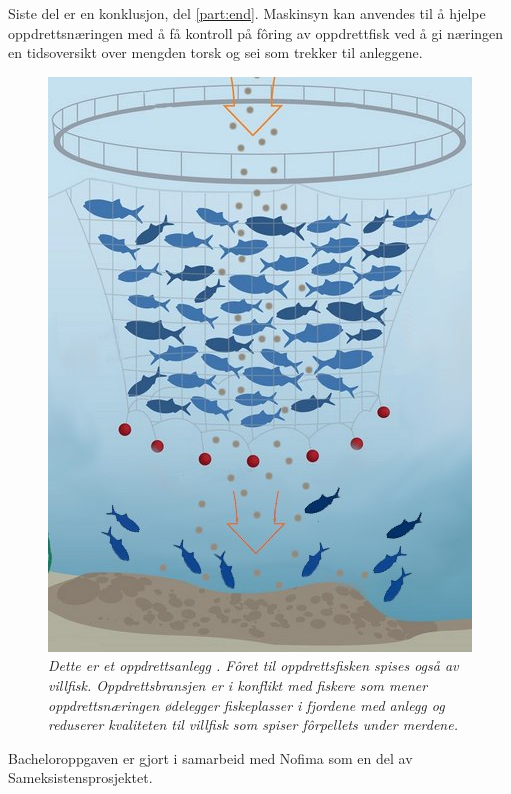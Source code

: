 Siste del er en konklusjon, del \ref{part:end}. Maskinsyn kan anvendes til å hjelpe oppdrettsnæringen med å få kontroll på fôring av oppdrettfisk ved å gi næringen en tidsoversikt over mengden torsk og sei som trekker til anleggene.

\begin{figure} 
\begin{center} 
\includegraphics[scale=0.7]{figures/merder-fisk}
\caption{\small \sl Dette er et oppdrettsanlegg \cite{Spruill 2011 s. 12}. Fôret til oppdrettsfisken spises også av villfisk. Oppdrettsbransjen er i konflikt med fiskere som mener oppdrettsnæringen ødelegger fiskeplasser i fjordene med anlegg og reduserer kvaliteten til villfisk som spiser fôrpellets under merdene. \cite{Olsen m.fl. 2018} \label{fig:anlegg}} 
\end{center} 
\end{figure} 

Bacheloroppgaven er gjort i samarbeid med Nofima som en del av Sameksistensprosjektet. \cite{Robertsen 2020}